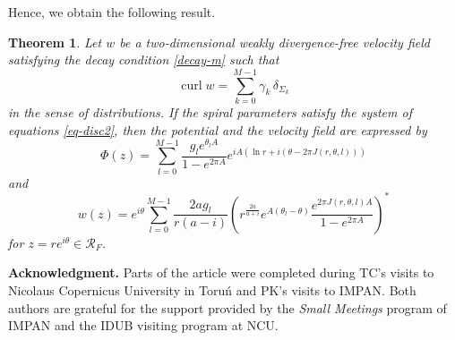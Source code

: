 \documentclass[11pt, letterpaper, reqno]{amsart}
\numberwithin{equation}{section}
\theoremstyle{definition}
\theoremstyle{plain}
\newtheorem{theorem}{Theorem}[section]
\numberwithin{equation}{section}
\def\RR{\mathcal{R}}
\DeclareMathOperator{\curl}{curl}
\begin{document}
Hence, we obtain the following result. 
\begin{theorem}\label{th_wiele_spiral}
Let $w$ be a two-dimensional weakly divergence-free velocity field satisfying the decay condition \eqref{decay-m} such that 
\[
\curl w = \sum_{k=0}^{M-1}\gamma_{k}\, \delta_{\Sigma_{k}}
\]
in the sense of distributions. If the spiral parameters satisfy the system of equations \eqref{eq-disc2}, 
then the potential and the velocity field are expressed by 
\begin{equation*}
\Phi(z) = \sum_{l=0}^{M-1} \frac{g_{l}e^{\theta_{l}A}}{1-e^{2\pi A}} e^{iA(\ln r + i(\theta - 2\pi J(r,\theta,l)))}
\end{equation*}
and
\begin{equation*}
w(z) =  e^{i\theta } \sum_{l=0}^{M-1} \frac{2ag_{l} }{r(a-i)} \left(  r^{\frac{2a}{a+i} }e^{A  (\theta_l -\theta ) } \frac{e^{2\pi J (r,\theta ,l)A }}{1-e^{2\pi A}} \right)^*
\end{equation*}
for $z = re^{i\theta} \in\RR_{F}$.
\end{theorem}




\vspace{0.5cm}
\noindent
{\bf Acknowledgment.} Parts of the article were completed during TC's visits to Nicolaus Copernicus University in Toru\'n and PK's visits to IMPAN. Both authors are grateful for the support provided by the {\em Small Meetings} program of IMPAN and the IDUB visiting program at NCU.
\end{document}
